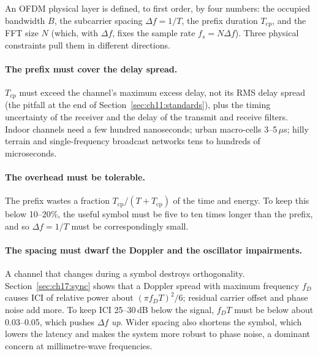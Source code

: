 An OFDM physical layer is defined, to first order, by four numbers: the occupied bandwidth $B$, the
subcarrier spacing $\Delta f=1/T$, the prefix duration $T_{\text{cp}}$, and the FFT size $N$ (which,
with $\Delta f$, fixes the sample rate $f_s=N\Delta f$). Three physical constraints pull them in
different directions.

\paragraph{The prefix must cover the delay spread.} $T_{\text{cp}}$ must exceed the channel's maximum
excess delay, not its RMS delay spread (the pitfall at the end of Section~\ref{sec:ch11:standards}), plus
the timing uncertainty of the receiver and the delay of the transmit and receive filters. Indoor
channels need a few hundred nanoseconds; urban macro-cells 3--5\,$\mu$s; hilly terrain and
single-frequency broadcast networks tens to hundreds of microseconds.


\paragraph{The overhead must be tolerable.} The prefix wastes a fraction
$T_{\text{cp}}/(T+T_{\text{cp}})$ of the time and energy. To keep this below 10--20\%, the useful
symbol must be five to ten times longer than the prefix, and so $\Delta f=1/T$ must be correspondingly
small.

\paragraph{The spacing must dwarf the Doppler and the oscillator impairments.} A channel that changes
during a symbol destroys orthogonality. Section~\ref{sec:ch17:sync} shows that a Doppler spread with
maximum frequency $f_D$ causes ICI of relative power about $(\pi f_DT)^2/6$; residual carrier offset
and phase noise add more. To keep ICI 25--30\,dB below the signal, $f_DT$ must be below about
0.03--0.05, which pushes $\Delta f$ \emph{up}. Wider spacing also shortens the symbol, which lowers the
latency and makes the system more robust to phase noise, a dominant concern at millimetre-wave
frequencies.

